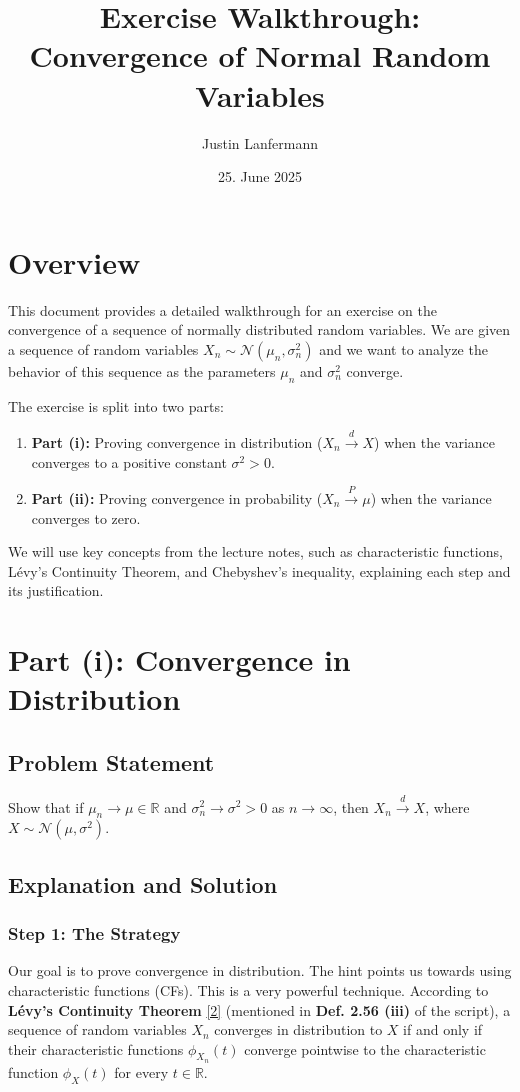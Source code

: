 \documentclass[11pt,a4paper]{article}
\title{Exercise Walkthrough: Convergence of Normal Random Variables}
\author{Justin Lanfermann}
\date{25. June 2025}
\begin{document}
\maketitle

\section*{Overview}
This document provides a detailed walkthrough for an exercise on the convergence of a sequence of normally distributed random variables. We are given a sequence of random variables $X_n \sim \mathcal{N}(\mu_n, \sigma_n^2)$ and we want to analyze the behavior of this sequence as the parameters $\mu_n$ and $\sigma_n^2$ converge.

The exercise is split into two parts:
\begin{enumerate}
    \item \textbf{Part (i):} Proving convergence in distribution ($X_n \stackrel{d}{\longrightarrow} X$) when the variance converges to a positive constant $\sigma^2 > 0$.
    \item \textbf{Part (ii):} Proving convergence in probability ($X_n \stackrel{P}{\longrightarrow} \mu$) when the variance converges to zero.
\end{enumerate}
We will use key concepts from the lecture notes, such as characteristic functions, Lévy's Continuity Theorem, and Chebyshev's inequality, explaining each step and its justification.

\section{Part (i): Convergence in Distribution}

\subsection*{Problem Statement}
Show that if $\mu_n \to \mu \in \mathbb{R}$ and $\sigma_n^2 \to \sigma^2 > 0$ as $n \to \infty$, then $X_n \stackrel{d}{\longrightarrow} X$, where $X \sim \mathcal{N}(\mu, \sigma^2)$.

\subsection*{Explanation and Solution}

\subsubsection*{Step 1: The Strategy}
Our goal is to prove convergence in distribution. The hint points us towards using characteristic functions (CFs). This is a very powerful technique. According to \textbf{Lévy's Continuity Theorem} \hyperlink{note2}{[2]} (mentioned in \textbf{Def. 2.56 (iii)} of the script), a sequence of random variables $X_n$ converges in distribution to $X$ if and only if their characteristic functions $\phi_{X_n}(t)$ converge pointwise to the characteristic function $\phi_X(t)$ for every $t \in \mathbb{R}$.
\end{document}
